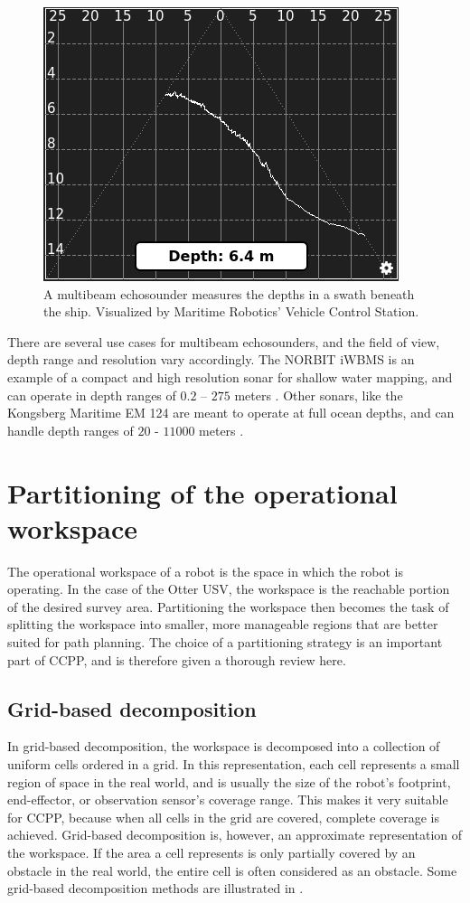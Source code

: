 \begin{figure}[h!]
    \centering
	\includegraphics[width=0.5\linewidth]{fig/lit_rev/mbes}
	\caption[Multibeam echosounder measurement of the seabead.]{A multibeam echosounder measures the depths in a swath beneath the ship. Visualized by Maritime Robotics' Vehicle Control Station.}
	\label{fig:mbes}
\end{figure}

There are several use cases for multibeam echosounders, and the field of view, depth range and resolution vary accordingly. The NORBIT iWBMS is an example of a compact and high resolution sonar for shallow water mapping, and can operate in depth ranges of $0.2$ -- $275$ meters \citep{website:norbit}. Other sonars, like the Kongsberg Maritime EM 124 are meant to operate at full ocean depths, and can handle depth ranges of $20$ - $11000$ meters \citep{website:km}.

\section{Partitioning of the operational workspace}

The operational workspace of a robot is the space in which the robot is operating. In the case of the Otter USV, the workspace is the reachable portion of the desired survey area. Partitioning the workspace then becomes the task of splitting the workspace into smaller, more manageable regions that are better suited for path planning. The choice of a partitioning strategy is an important part of CCPP, and is therefore given a thorough review here.


\subsection{Grid-based decomposition}

In grid-based decomposition, the workspace is decomposed into a collection of uniform cells ordered in a grid. In this representation, each cell represents a small region of space in the real world, and is usually the size of the robot's footprint, end-effector, or observation sensor's coverage range. This makes it very suitable for CCPP, because when all cells in the grid are covered, complete coverage is achieved. Grid-based decomposition is, however, an approximate representation of the workspace. If the area a cell represents is only partially covered by an obstacle in the real world, the entire cell is often considered as an obstacle. Some grid-based decomposition methods are illustrated in .


